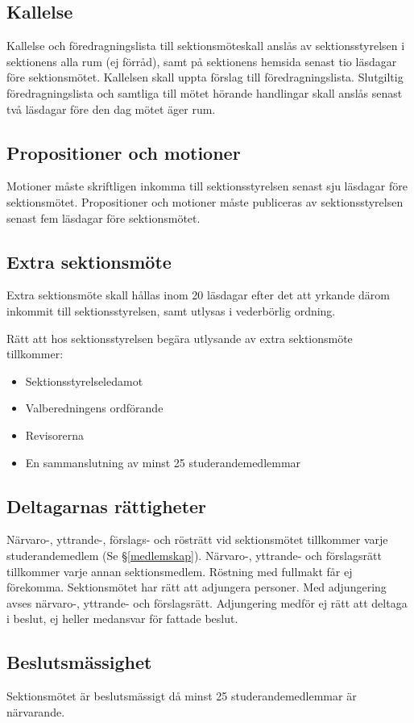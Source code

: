 \documentclass{datateknologsektionen-document}
\begin{document}
\subsection{Kallelse}
Kallelse och föredragningslista till sektionsmöteskall anslås av sektionsstyrelsen i
sektionens alla rum (ej förråd), samt på sektionens hemsida senast tio läsdagar före
sektionsmötet. Kallelsen skall uppta förslag till föredragningslista. Slutgiltig
föredragningslista och samtliga till mötet hörande handlingar skall anslås senast två
läsdagar före den dag mötet äger rum.
\subsection{Propositioner och motioner}
Motioner måste skriftligen inkomma till sektionsstyrelsen senast sju läsdagar före sektionsmötet. Propositioner och motioner måste publiceras av sektionsstyrelsen senast fem läsdagar före sektionsmötet.
\subsection{Extra sektionsmöte}
Extra sektionsmöte skall hållas inom 20 läsdagar efter det att yrkande därom inkommit
till sektionsstyrelsen, samt utlysas i vederbörlig ordning.

Rätt att hos sektionsstyrelsen begära utlysande av extra sektionsmöte tillkommer:
\begin{itemize}
  \item Sektionsstyrelseledamot
  \item Valberedningens ordförande
  \item Revisorerna
  \item En sammanslutning av minst 25 studerandemedlemmar
\end{itemize}

\subsection{Deltagarnas rättigheter}
Närvaro-, yttrande-, förslags- och rösträtt vid sektionsmötet tillkommer varje
studerandemedlem (Se \S \ref{medlemskap}). Närvaro-, yttrande- och förslagsrätt tillkommer varje annan
sektionsmedlem. Röstning med fullmakt får ej förekomma. Sektionsmötet har rätt att
adjungera personer. Med adjungering avses närvaro-, yttrande- och förslagsrätt.
Adjungering medför ej rätt att deltaga i beslut, ej heller medansvar för fattade beslut.
\subsection{Beslutsmässighet}
Sektionsmötet är beslutsmässigt då minst 25 studerandemedlemmar är närvarande.
\end{document}
